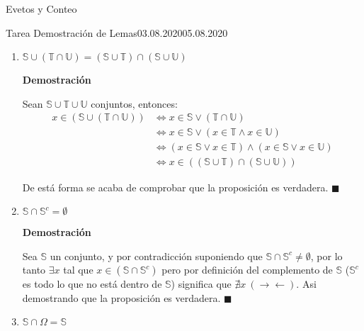 \documentclass[a4paper]{book}
\begin{document}
\begin{chapter}{Evetos y Conteo}
\begin{tarea}{Tarea Demostración de Lemas}{03.08.2020}{05.08.2020}
\begin{enumerate}
                Así demostrando que la proposición es verdadera. $\blacksquare$

                \item $\mathbb S\cup(\mathbb T\cap \mathbb U)=(\mathbb S\cup
                    \mathbb T)\cap(\mathbb S\cup \mathbb U)$

                \textbf{Demostración}

                Sean $\mathbb S\cup\mathbb T\cup\mathbb U$ conjuntos, entonces:
                \begin{equation*}
                \label{eq:1.16}
                \begin{split}
                    x\in\left(\mathbb S\cup\left(\mathbb T\cap \mathbb
                    U\right)\right)&\iff x\in\mathbb S\lor\left(\mathbb
                    T\cap\mathbb U\right)\\
                    &\iff x\in\mathbb S\lor\left(x\in\mathbb T\land x\in\mathbb
                    U\right)\\
                    &\iff \left(x\in\mathbb S\lor x\in\mathbb
                    T\right)\land\left(x\in\mathbb S\lor x\in\mathbb U\right)\\
                    &\iff x \in\left(\left(\mathbb S\cup\mathbb
                    T\right)\cap\left(\mathbb S\cup\mathbb U\right)\right)
                \end{split}
                \end{equation*}

                De está forma se acaba de comprobar que la proposición es
                verdadera. $\blacksquare$

                \item $\mathbb S\cap \mathbb S^{c}=\emptyset$

                \textbf{Demostración}

                Sea $\mathbb S$ un conjunto, y por contradicción suponiendo que
                $\mathbb S\cap\mathbb S^{c}\ne\emptyset$, por lo tanto $\exists
                x$ tal que $x\in\left(\mathbb S\cap\mathbb S^{c}\right)$ pero
                por definición del complemento de $\mathbb S$ ($\mathbb S^{c}$
                es todo lo que no está dentro de $\mathbb S$) significa que
                $\nexists x\ \left(\to\gets\right)$. Asi demostrando que la
                proposición es verdadera. $\blacksquare$

                \item $\mathbb S\cap \Omega=\mathbb S$


\end{enumerate}
\end{tarea}
\end{chapter}
\end{document}
